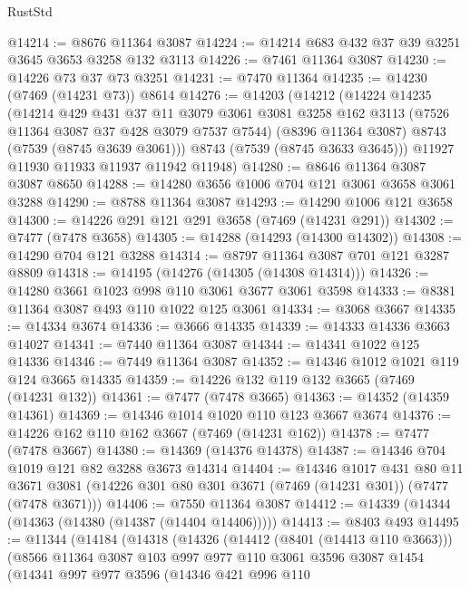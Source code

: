 \begin{lexlean}{RustStd}
\begin{coremodule}
@14214 := @8676 @11364 @3087
@14224 := @14214 @683 @432 @37 @39 @3251 @3645 @3653 @3258 @132 @3113
@14226 := @7461 @11364 @3087
@14230 := @14226 @73 @37 @73 @3251
@14231 := @7470 @11364
@14235 := @14230 (@7469 (@14231 @73)) @8614
@14276 := @14203
    (@14212
      (@14224
        @14235
        (@14214
          @429
          @431
          @37
          @11
          @3079
          @3061
          @3081
          @3258
          @162
          @3113
          (@7526 @11364 @3087 @37 @428 @3079 @7537 @7544)
          (@8396 @11364 @3087)
          @8743
          (@7539 (@8745 @3639 @3061)))
        @8743
        (@7539 (@8745 @3633 @3645)))
      @11927
      @11930
      @11933
      @11937
      @11942
      @11948)
@14280 := @8646 @11364 @3087 @3087 @8650
@14288 := @14280 @3656 @1006 @704 @121 @3061 @3658 @3061 @3288
@14290 := @8788 @11364 @3087
@14293 := @14290 @1006 @121 @3658
@14300 := @14226 @291 @121 @291 @3658 (@7469 (@14231 @291))
@14302 := @7477 (@7478 @3658)
@14305 := @14288 (@14293 (@14300 @14302))
@14308 := @14290 @704 @121 @3288
@14314 := @8797 @11364 @3087 @701 @121 @3287 @8809
@14318 := @14195 (@14276 (@14305 (@14308 @14314)))
@14326 := @14280 @3661 @1023 @998 @110 @3061 @3677 @3061 @3598
@14333 := @8381 @11364 @3087 @493 @110 @1022 @125 @3061
@14334 := @3068 @3667
@14335 := @14334 @3674
@14336 := @3666 @14335
@14339 := @14333 @14336 @3663 @14027
@14341 := @7440 @11364 @3087
@14344 := @14341 @1022 @125 @14336
@14346 := @7449 @11364 @3087
@14352 := @14346 @1012 @1021 @119 @124 @3665 @14335
@14359 := @14226 @132 @119 @132 @3665 (@7469 (@14231 @132))
@14361 := @7477 (@7478 @3665)
@14363 := @14352 (@14359 @14361)
@14369 := @14346 @1014 @1020 @110 @123 @3667 @3674
@14376 := @14226 @162 @110 @162 @3667 (@7469 (@14231 @162))
@14378 := @7477 (@7478 @3667)
@14380 := @14369 (@14376 @14378)
@14387 := @14346 @704 @1019 @121 @82 @3288 @3673 @14314
@14404 := @14346
    @1017
    @431
    @80
    @11
    @3671
    @3081
    (@14226 @301 @80 @301 @3671 (@7469 (@14231 @301)) (@7477 (@7478 @3671)))
@14406 := @7550 @11364 @3087
@14412 := @14339 (@14344 (@14363 (@14380 (@14387 (@14404 @14406)))))
@14413 := @8403 @493
@14495 := @11344
    (@14184
      (@14318
        (@14326
          (@14412 (@8401 (@14413 @110 @3663)))
          (@8566
            @11364
            @3087
            @103
            @997
            @977
            @110
            @3061
            @3596
            @3087
            @1454
            (@14341
              @997
              @977
              @3596
              (@14346
                @421
                @996
                @110

\end{coremodule}
\end{lexlean}
